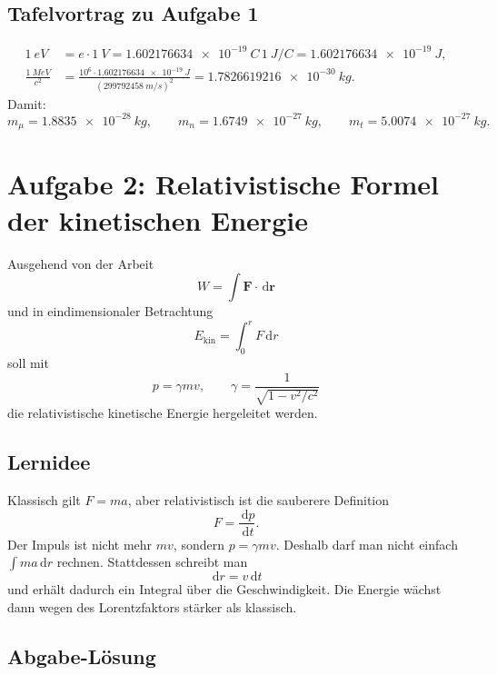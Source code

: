 \documentclass[11pt,a4paper]{scrartcl}
\newcommand{\dd}{\,\mathrm{d}}
\newcommand{\dv}[2]{\frac{\dd #1}{\dd #2}}
\newcommand{\vect}[1]{\bm{#1}}
\theoremstyle{definition}
\theoremstyle{plain}
\theoremstyle{remark}
\begin{document}
\subsection{Tafelvortrag zu Aufgabe 1}
\begin{talkbox}
\begin{align*}
    \SI{1}{eV} &= e\cdot \SI{1}{V}
    = \SI{1.602176634e-19}{C}\,\SI{1}{J/C}
    = \SI{1.602176634e-19}{J},\\
    \frac{\SI{1}{MeV}}{c^2}
    &= \frac{10^6\cdot \SI{1.602176634e-19}{J}}{(\SI{299792458}{m/s})^2}
    = \SI{1.7826619216e-30}{kg}.
\end{align*}
Damit:
\[
    m_\mu=\SI{1.8835e-28}{kg},\qquad
    m_n=\SI{1.6749e-27}{kg},\qquad
    m_t=\SI{5.0074e-27}{kg}.
\]
\end{talkbox}

\FloatBarrier
\newpage

\section{Aufgabe 2: Relativistische Formel der kinetischen Energie}

\begin{taskbox}
Ausgehend von der Arbeit
\[
    W=\int \vect F\cdot\dd\vect r
\]
und in eindimensionaler Betrachtung
\[
    E_{\mathrm{kin}}=\int_0^r F\dd r
\]
soll mit
\[
    p=\gamma mv,\qquad \gamma=\frac{1}{\sqrt{1-v^2/c^2}}
\]
die relativistische kinetische Energie hergeleitet werden.
\end{taskbox}

\subsection{Lernidee}

\begin{learningbox}
Klassisch gilt $F=ma$, aber relativistisch ist die sauberere Definition
\[
    F = \dv{p}{t}.
\]
Der Impuls ist nicht mehr $mv$, sondern $p=\gamma mv$. Deshalb darf man nicht einfach $\int ma\dd r$ rechnen. Stattdessen schreibt man
\[
    \dd r = v\dd t
\]
und erhält dadurch ein Integral über die Geschwindigkeit. Die Energie wächst dann wegen des Lorentzfaktors stärker als klassisch.
\end{learningbox}

\subsection{Abgabe-Lösung}
\end{document}
